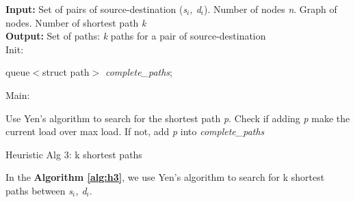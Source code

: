 \begin{algorithm}
\textbf{Input:} Set of pairs of source-destination (\textit{s$_i$, d$_i$}). Number of nodes \textit{n}. Graph of nodes. Number of shortest path \textit{k}\\
\textbf{Output:} Set of paths: \textit{k} paths for a pair of source-destination\\
Init:
    \begin{algorithmic}
        \State queue$<$struct path$>$ \textit{complete\_paths};
    \end{algorithmic}
Main:
\begin{algorithmic}
		\State Use Yen's algorithm to search for the shortest path \textit{p}.
		\State Check if adding \textit{p} make the current load over max load.
		\State If not, add \textit{p} into \textit{complete\_paths}
	    \EndWhile
	\EndFor
    \EndFunction
\end{algorithmic}

\caption{Heuristic Alg 3: k shortest paths}
\label{alg:h3}

\end{algorithm}

In the \textbf{Algorithm \ref{alg:h3}}, we use Yen's algorithm to search for k shortest paths between \textit{s$_i$, d$_i$}.

